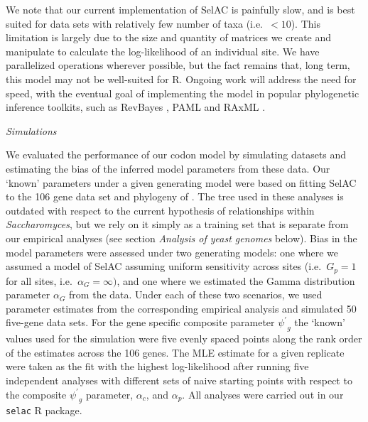 \documentclass[12pt,letterpaper]{article}
\renewcommand{\subsection}[1]{%
\bigskip
\begin{center}
\begin{large}
\normalfont\itshape #1
\end{large}
\end{center}}
\newcommand{\selac}{SelAC\xspace}
\newcommand{\alphac}{\ensuremath{\alpha_c}\xspace}
\newcommand{\alphag}{\ensuremath{\alpha_G}\xspace}
\newcommand{\alphap}{\ensuremath{\alpha_p}\xspace}
\newcommand{\psiprime}{\ensuremath{\psi^\prime}\xspace}
\newcommand{\gp}{\ensuremath{{G_p}}\xspace}
\begin{document}
We note that our current implementation of \selac is painfully slow, and is best suited for data sets with relatively few number of taxa (i.e.~$<10$).
This limitation is largely due to the size and quantity of matrices we create and manipulate to calculate the log-likelihood of an individual site.
We have parallelized operations wherever possible, but the fact remains that, long term, this model may not be well-suited for R.
Ongoing work will address the need for speed, with the eventual goal of implementing the model in popular phylogenetic inference toolkits, such as RevBayes \citep{revbayes}, PAML \citep{Yang2007} and RAxML \citep{Stamatakis2006}.

\subsection{Simulations}
We evaluated the performance of our codon model by simulating datasets and estimating the bias of the inferred model parameters from these data.
Our `known' parameters under a given generating model were based on fitting SelAC to the 106 gene data set and phylogeny of \citet{RokasEtAl2003}.
The tree used in these analyses is outdated with respect to the current hypothesis of relationships within \emph{Saccharomyces}, but we rely on it simply as a training set that is separate from our empirical analyses (see section \emph{Analysis of yeast genomes} below).
Bias in the model parameters were assessed under two generating models: one where we assumed a model of SelAC assuming uniform sensitivity across sites (i.e.~$\gp = 1$ for all sites, i.e.~$\alphag = \infty)$, and one where we estimated the Gamma distribution parameter $\alphag$ from the data.
Under each of these two scenarios, we used parameter estimates from the corresponding empirical analysis and simulated 50 five-gene data sets.
For the gene specific composite parameter $\psiprime_g$ the `known' values used for the simulation were five evenly spaced points along the rank order of the estimates across the 106 genes.
The MLE estimate for a given replicate were taken as the fit with the highest log-likelihood after running five independent analyses with different sets of naive starting points with respect to the composite $\psiprime_g$ parameter, $\alphac$, and $\alphap$.
All analyses were carried out in our \texttt{selac} R package.
\end{document}
